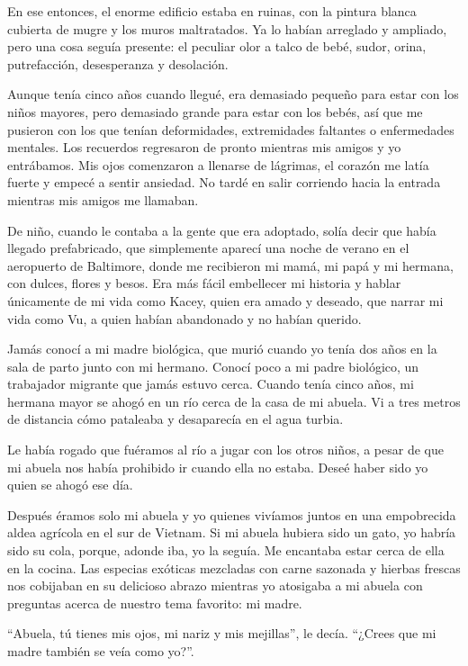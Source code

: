 En ese entonces, el enorme edificio estaba en ruinas, con la pintura
blanca cubierta de mugre y los muros maltratados. Ya lo habían arreglado
y ampliado, pero una cosa seguía presente: el peculiar olor a talco de
bebé, sudor, orina, putrefacción, desesperanza y desolación.

Aunque tenía cinco años cuando llegué, era demasiado pequeño para estar
con los niños mayores, pero demasiado grande para estar con los bebés,
así que me pusieron con los que tenían deformidades, extremidades
faltantes o enfermedades mentales. Los recuerdos regresaron de pronto
mientras mis amigos y yo entrábamos. Mis ojos comenzaron a llenarse de
lágrimas, el corazón me latía fuerte y empecé a sentir ansiedad. No
tardé en salir corriendo hacia la entrada mientras mis amigos me
llamaban.

De niño, cuando le contaba a la gente que era adoptado, solía decir que
había llegado prefabricado, que simplemente aparecí una noche de verano
en el aeropuerto de Baltimore, donde me recibieron mi mamá, mi papá y mi
hermana, con dulces, flores y besos. Era más fácil embellecer mi
historia y hablar únicamente de mi vida como Kacey, quien era amado y
deseado, que narrar mi vida como Vu, a quien habían abandonado y no
habían querido.

Jamás conocí a mi madre biológica, que murió cuando yo tenía dos años en
la sala de parto junto con mi hermano. Conocí poco a mi padre biológico,
un trabajador migrante que jamás estuvo cerca. Cuando tenía cinco años,
mi hermana mayor se ahogó en un río cerca de la casa de mi abuela. Vi a
tres metros de distancia cómo pataleaba y desaparecía en el agua turbia.

Le había rogado que fuéramos al río a jugar con los otros niños, a pesar
de que mi abuela nos había prohibido ir cuando ella no estaba. Deseé
haber sido yo quien se ahogó ese día.

Después éramos solo mi abuela y yo quienes vivíamos juntos en una
empobrecida aldea agrícola en el sur de Vietnam. Si mi abuela hubiera
sido un gato, yo habría sido su cola, porque, adonde iba, yo la seguía.
Me encantaba estar cerca de ella en la cocina. Las especias exóticas
mezcladas con carne sazonada y hierbas frescas nos cobijaban en su
delicioso abrazo mientras yo atosigaba a mi abuela con preguntas acerca
de nuestro tema favorito: mi madre.

``Abuela, tú tienes mis ojos, mi nariz y mis mejillas'', le decía.
``¿Crees que mi madre también se veía como yo?''.

